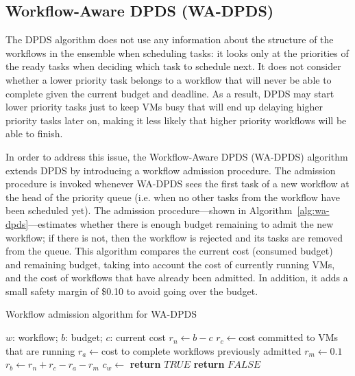 \documentclass[conference]{IEEEtran}
\begin{document}
\subsection{Workflow-Aware DPDS (WA-DPDS)}

The DPDS algorithm does not use any information about the structure of the workflows in the ensemble when scheduling tasks: it looks only at the priorities of the ready tasks when deciding which task to schedule next. It does not consider whether a lower priority task belongs to a workflow that will never be able to complete given the current budget and deadline. As a result, DPDS may start lower priority tasks just to keep VMs busy that will end up delaying higher priority tasks later on, making it less likely that higher priority workflows will be able to finish.

In order to address this issue, the Workflow-Aware DPDS (WA-DPDS) algorithm extends DPDS by introducing a workflow admission procedure. The admission procedure is invoked whenever WA-DPDS sees the first task of a new workflow at the head of the priority queue (i.e. when no other tasks from the workflow have been scheduled yet). The admission procedure---shown in Algorithm~\ref{alg:wa-dpds}---estimates whether there is enough budget remaining to admit the new workflow; if there is not, then the workflow is rejected and its tasks are removed from the queue. This algorithm compares the current cost (consumed budget) and remaining budget, taking into account the cost of currently running VMs, and the cost of workflows that have already been admitted. In addition, it adds a small safety margin of \$0.10 to avoid going over the budget.

\begin{algorithm}[tb]
\caption{Workflow admission algorithm for WA-DPDS}
\label{alg:wa-dpds}
{\small
\begin{algorithmic}[1]
\Require $w$: workflow; $b$: budget; $c$: current cost
    \State $r_n\gets b-c$ 
    \State $r_c\gets $cost committed to VMs that are running
    \State $r_a\gets $cost to complete workflows previously admitted
  \State $r_m\gets 0.1$ 
  \State $r_b\gets r_n+r_c-r_a-r_m$ 
  \State $c_w\gets$ 
      \State \textbf{return} $TRUE$
    \Else
      \State \textbf{return} $FALSE$
  \EndIf       
\EndProcedure
\end{algorithmic}
}
\end{algorithm}
\end{document}
